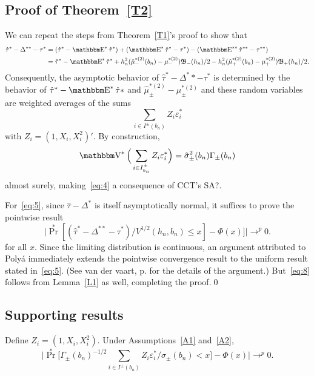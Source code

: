 \documentclass[12pt,fleqn]{article}
\begin{document}
\subsection{Proof of Theorem~\ref{T2}}
We can repeat the steps from Theorem~\ref{T1}'s proof to show that
\begin{align*}
  \hat\tau^* - \Delta^{**} - \tau^* &= (\hat\tau^* - \E^* \hat \tau^*) +
  (\E^* \hat \tau^* - \tau^*) - (\E^{**} \hat \tau^{**} - \tau^{**}) \\
  &= \hat\tau^* - \E^*\hat\tau^*
   + h_n^2 (\hat\mu_-^{*(2)}(b_n) - \mu_-^{*(2)}) \Bf_{-}(h_{n}) /2
   - h_n^2 (\hat\mu_+^{*(2)}(b_n) - \mu_+^{*(2)}) \Bf_{+}(h_{n}) / 2.
\end{align*}
Consequently, the asymptotic behavior of
$\hat\tau^* - \Delta^** - \tau^*$ is determined by the behavior of
$\hat\tau^* - \E^*\hat\tau*$ and
$\hat\mu_{\pm}^{*(2)} - \mu_\pm^{*(2)}$ and these random variables are
weighted averages of the sums
\begin{equation*}
  \sum_{i \in I^{\pm}(b_n)} Z_i \varepsilon_i^*
\end{equation*}
with $Z_i = (1, X_i, X_i^2)'$. By construction,
\begin{equation*}
  \V^*\Big(\ssum{i}{b_n} Z_i \varepsilon_i^* \Big)
  = \hat\sigma_\pm^2(b_n) \Gamma_\pm(b_n)
\end{equation*}
almost surely, making~\eqref{eq:4} a consequence of CCT's SA?.

For~\eqref{eq:5}, since $\hat\tau - \Delta^*$ is itself asymptotically
normal, it suffices to prove the pointwise result
\begin{equation}
  \label{eq:8}
  \Big\rvert \Pr^*[(\hat\tau^{*} - \Delta^{**} - \tau^*)
  / V^{1/2}(h_n,b_n) \leq x ] - \Phi(x)] \Big\lvert \to^p 0.
\end{equation}
for all $x$. Since the limiting distribution is continuous, an
argument attributed to Poly\'a immediately extends the pointwise
convergence result to the uniform result stated in~\eqref{eq:5}. (See
van der vaart, p. for the details of the argument.) But~\eqref{eq:8}
follows from Lemma~\ref{L1} as well, completing the proof.\qed

\subsection{Supporting results}

\begin{lemma}\label{L1}
  Define $Z_i = (1, X_i, X_i^2)$.  Under Assumptions~\ref{A1} and~\ref{A2},
  \begin{equation}
    \label{eq:9}
    \Big\rvert \Pr^*\Big[ \Gamma_\pm(b_n)^{-1/2}
    \sum_{i \in I^{\pm}(b_n)} Z_i \varepsilon_i^* / \hat\sigma_\pm(b_n) < x \Big]
    - \Phi(x) \Big\lvert \to^p 0.
  \end{equation}
\end{lemma}
\end{document}
